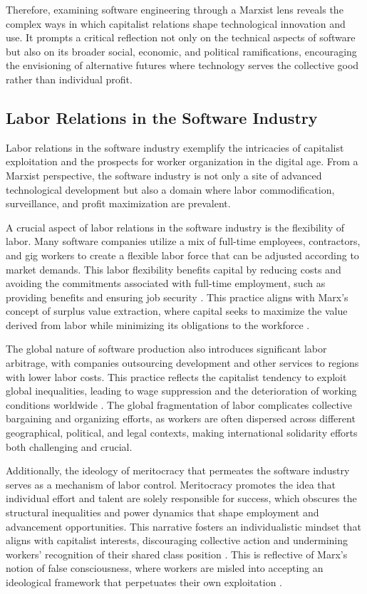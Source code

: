 \begin{refsection}
Therefore, examining software engineering through a Marxist lens reveals the complex ways in which capitalist relations shape technological innovation and use. It prompts a critical reflection not only on the technical aspects of software but also on its broader social, economic, and political ramifications, encouraging the envisioning of alternative futures where technology serves the collective good rather than individual profit.

\subsection{Labor Relations in the Software Industry}

Labor relations in the software industry exemplify the intricacies of capitalist exploitation and the prospects for worker organization in the digital age. From a Marxist perspective, the software industry is not only a site of advanced technological development but also a domain where labor commodification, surveillance, and profit maximization are prevalent.

A crucial aspect of labor relations in the software industry is the flexibility of labor. Many software companies utilize a mix of full-time employees, contractors, and gig workers to create a flexible labor force that can be adjusted according to market demands. This labor flexibility benefits capital by reducing costs and avoiding the commitments associated with full-time employment, such as providing benefits and ensuring job security \cite[pp.~54-57]{fuchs2017social}. This practice aligns with Marx's concept of surplus value extraction, where capital seeks to maximize the value derived from labor while minimizing its obligations to the workforce \cite[pp.~320-323]{marx2008capital}.

The global nature of software production also introduces significant labor arbitrage, with companies outsourcing development and other services to regions with lower labor costs. This practice reflects the capitalist tendency to exploit global inequalities, leading to wage suppression and the deterioration of working conditions worldwide \cite[pp.~117-119]{schiller2014digital}. The global fragmentation of labor complicates collective bargaining and organizing efforts, as workers are often dispersed across different geographical, political, and legal contexts, making international solidarity efforts both challenging and crucial.

Additionally, the ideology of meritocracy that permeates the software industry serves as a mechanism of labor control. Meritocracy promotes the idea that individual effort and talent are solely responsible for success, which obscures the structural inequalities and power dynamics that shape employment and advancement opportunities. This narrative fosters an individualistic mindset that aligns with capitalist interests, discouraging collective action and undermining workers' recognition of their shared class position \cite[pp.~91-93]{eghbal2020working}. This is reflective of Marx's notion of false consciousness, where workers are misled into accepting an ideological framework that perpetuates their own exploitation \cite[pp.~89-91]{eagleton2017ideology}.


\end{refsection}
